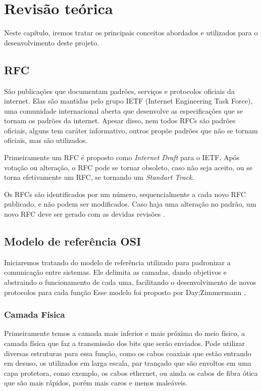 \chapter{Revis{\~a}o te{\'o}rica}
\label{chap:Revisao Teorica}
	
Neste capítulo, iremos tratar os principais conceitos abordados e utilizados para o desenvolvimento deste projeto.

\section{RFC}

São publicações que documentam padrões, serviços e protocolos oficiais da internet. Elas são mantidas pelo grupo IETF (Internet Engineering Task Force), uma comunidade internacional aberta que desenvolve as especificações que se tornam os padrões da internet. Apesar disso, nem todos RFCs são padrões oficiais, alguns tem caráter informativo, outros propõe padrões que não se tornam oficiais, mas são utilizados.

Primeiramente um RFC é proposto como \textit{Internet Draft} para o IETF. Após votação ou alteração, o RFC pode se tornar obsoleto, caso não seja aceito, ou se torna efetivamente um RFC, se tornando um \textit{Standart Track}.

Os RFCs são identificados por um número, sequencialmente a cada novo RFC publicado, e não podem ser modificados. Caso haja uma alteração no padrão, um novo RFC deve ser gerado com as devidas revisões \cite{rfclocaweb}.


\section{Modelo de referência OSI}

Iniciaremos tratando do modelo de referência utilizado para padronizar a comunicação entre sistemas. Ele delimita as camadas, dando objetivos e abstraindo o funcionamento de cada uma, facilitando o desenvolvimento de novos protocolos para cada função Esse modelo foi proposto por Day;Zimmermann \cite{tanenbaumredes}.

\subsection{Camada Física}

Primeiramente temos a camada mais inferior e mais próxima do meio físico, a camada física que faz a transmissão dos bits que serão enviados. Pode utilizar diversas estruturas para essa função, como os cabos coaxiais que estão entrando em desuso, os utilizados em larga escala, par trançado que são envoltos em uma capa protetora, como exemplo, os cabos ethernet, ou ainda os cabos de fibra ótica que são mais rápidos, porém mais caros e menos maleáveis.

